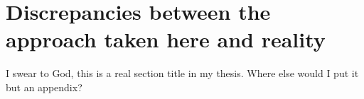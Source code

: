 \section{Discrepancies between the approach taken here and reality}
I swear to God, this is a real section title in my thesis. Where else would I put it but an appendix?

